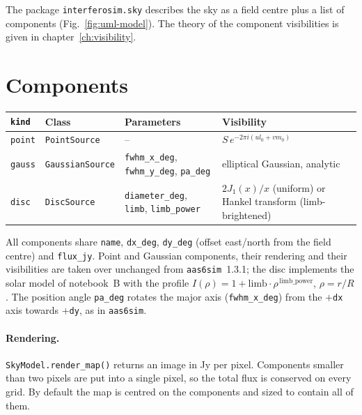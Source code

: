 \label{ch:sky-models}
The package \texttt{interferosim.sky} describes the sky as a field centre
plus a list of components (Fig.~\ref{fig:uml-model}). The theory of the
component visibilities is given in chapter~\ref{ch:visibility}.

\section{Components}

\begin{center}
\begin{tabular}{@{}lll>{\raggedright\arraybackslash}p{5.6cm}@{}}
\toprule
\texttt{kind} & Class & Parameters & Visibility \\
\midrule
\texttt{point} & \texttt{PointSource} & -- & $S\,e^{-2\pi i(ul_0+vm_0)}$ \\
\texttt{gauss} & \texttt{GaussianSource} & \texttt{fwhm\_x\_deg}, \texttt{fwhm\_y\_deg}, \texttt{pa\_deg}
               & elliptical Gaussian, analytic \\
\texttt{disc}  & \texttt{DiscSource} & \texttt{diameter\_deg}, \texttt{limb}, \texttt{limb\_power}
               & $2J_1(x)/x$ (uniform) or Hankel transform (limb-brightened) \\
\bottomrule
\end{tabular}
\end{center}

All components share \texttt{name}, \texttt{dx\_deg}, \texttt{dy\_deg}
(offset east/north from the field centre) and \texttt{flux\_jy}. Point and
Gaussian components, their rendering and their visibilities are taken over
unchanged from \texttt{aas6sim}~1.3.1; the disc implements the solar model
of notebook~B with the profile $I(\rho) = 1 + \mathrm{limb}\cdot
\rho^{\,\mathrm{limb\_power}}$, $\rho = r/R$. The position angle
\texttt{pa\_deg} rotates the major axis (\texttt{fwhm\_x\_deg}) from the
$+$\texttt{dx} axis towards $+$\texttt{dy}, as in \texttt{aas6sim}.

\paragraph*{Rendering.} \texttt{SkyModel.render\_map()} returns an image in
Jy per pixel. Components smaller than two pixels are put into a single
pixel, so the total flux is conserved on every grid. By default the map
is centred on the components and sized to contain all of them.

